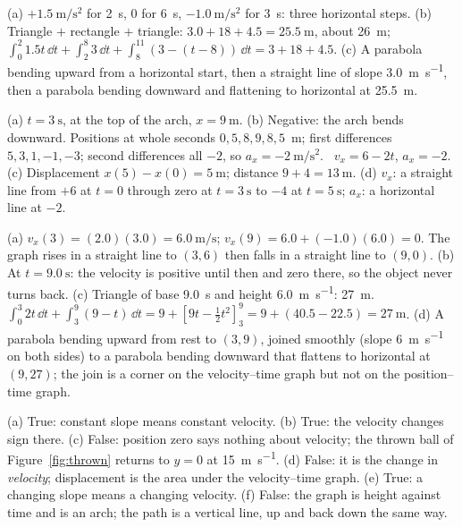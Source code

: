   \item[2.52] (a) $+\SI{1.5}{\metre\per\second\squared}$ for \SI{2}{\second}, $0$ for \SI{6}{\second}, $\SI{-1.0}{\metre\per\second\squared}$ for \SI{3}{\second}: three horizontal steps. (b) Triangle $+$ rectangle $+$ triangle: $3.0 + 18 + 4.5 = \SI{25.5}{\metre}$, about \SI{26}{\metre}; $\int_0^2 1.5t\,\dd t + \int_2^8 3\,\dd t + \int_8^{11} (3 - (t - 8))\,\dd t = 3 + 18 + 4.5$. (c) A parabola bending upward from a horizontal start, then a straight line of slope \SI{3.0}{\metre\per\second}, then a parabola bending downward and flattening to horizontal at \SI{25.5}{\metre}.
  \item[2.53] (a) $t = \SI{3}{\second}$, at the top of the arch, $x = \SI{9}{\metre}$. (b) Negative: the arch bends downward. Positions at whole seconds $0, 5, 8, 9, 8, 5$~m; first differences $5, 3, 1, -1, -3$; second differences all $-2$, so $a_x = \SI{-2}{\metre\per\second\squared}$. \calctag\ $v_x = 6 - 2t$, $a_x = -2$. (c) Displacement $x(5) - x(0) = \SI{5}{\metre}$; distance $9 + 4 = \SI{13}{\metre}$. (d) $v_x$: a straight line from $+6$ at $t = 0$ through zero at $t = \SI{3}{\second}$ to $-4$ at $t = \SI{5}{\second}$; $a_x$: a horizontal line at $-2$.
  \item[2.54] (a) $v_x(3) = (2.0)(3.0) = \SI{6.0}{\metre\per\second}$; $v_x(9) = 6.0 + (-1.0)(6.0) = 0$. The graph rises in a straight line to $(3, 6)$ then falls in a straight line to $(9, 0)$. (b) At $t = \SI{9.0}{\second}$: the velocity is positive until then and zero there, so the object never turns back. (c) Triangle of base \SI{9.0}{\second} and height \SI{6.0}{\metre\per\second}: \SI{27}{\metre}. \calctag\ $\int_0^3 2t\,\dd t + \int_3^9 (9 - t)\,\dd t = 9 + [9t - \tfrac12 t^2]_3^9 = 9 + (40.5 - 22.5) = \SI{27}{\metre}$. (d) A parabola bending upward from rest to $(3, 9)$, joined smoothly (slope \SI{6}{\metre\per\second} on both sides) to a parabola bending downward that flattens to horizontal at $(9, 27)$; the join is a corner on the velocity--time graph but not on the position--time graph.
  \item[2.55] (a) True: constant slope means constant velocity. (b) True: the velocity changes sign there. (c) False: position zero says nothing about velocity; the thrown ball of Figure~\ref{fig:thrown} returns to $y = 0$ at \SI{15}{\metre\per\second}. (d) False: it is the change in \emph{velocity}; displacement is the area under the velocity--time graph. (e) True: a changing slope means a changing velocity. (f) False: the graph is height against time and is an arch; the path is a vertical line, up and back down the same way.
